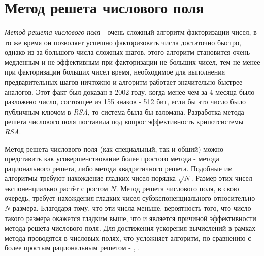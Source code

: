 \section{Метод решета числового поля}

\paragraph{} \textit{Метод решета числового поля} - очень сложный алгоритм факторизации чисел, в то же время он позволяет успешно факторизовать числа
  достаточно быстро, однако из-за большого числа сложных шагов, этого алгоритм становится очень медленным и не эффективным при факторизации
  не больших чисел, тем не менее при факторизации больших чисел время, необходимое для выполнения предварительных шагов ничтожно и алгоритм работает
  значительно быстрее аналогов. Этот факт был доказан в 2002 году, когда менее чем за 4 месяца было разложено число, состоящее из 155
  знаков - 512 бит, если бы это число было публичным ключом в \textit{RSA}, то система была бы взломана. Разработка метода решета числового поля 
  поставила под вопрос эффективность крипотсистемы \textit{RSA}.
  
  Метод решета числового поля (как специальный, так и общий) можно представить как усовершенствование более простого метода - метода 
  рационального решета, либо метода квадратичного решета. Подобные им алгоритмы требуют нахождение гладких чисел порядка {$\sqrt{N}$}. 
  Размер этих чисел экспоненциально растёт с ростом {$N$}. Метод решета числового поля, в свою очередь, требует нахождения гладких чисел 
  субэкспоненциального относительно {$N$} размера. Благодаря тому, что эти числа меньше, вероятность того, что число такого размера окажется гладким выше, что и 
  является причиной эффективности метода решета числового поля. Для достижения ускорения вычислений в рамках метода проводятся в числовых 
  полях, что усложняет алгоритм, по сравнению с более простым рациональным решетом - \cite[Глава 5, страницы 145-176]{ish11},
  \cite[Глава 6.4.2, страницы 222-225]{mah06}.
  
